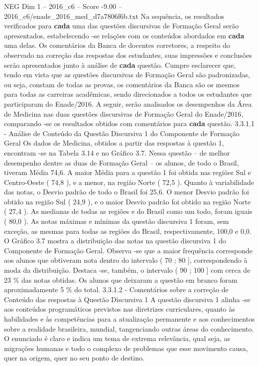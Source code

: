 \begin{textsample}{NEG Dim 1 – 2016\_c6 – Score -9.00 – 2016\_c6/enade\_2016\_med\_d7a7806f6b.txt}
Na sequência, os resultados verificados para \textbf{cada} uma das questões discursivas de Formação Geral serão apresentados, estabelecendo -se relações com os conteúdos abordados em \textbf{cada} uma delas.
Os comentários da Banca de docentes corretores, a respeito do observado na correção das respostas dos estudantes, suas impressões e conclusões serão apresentados junto à análise de \textbf{cada} questão.
Cumpre esclarecer que, tendo em vista que as questões discursivas de Formação Geral são padronizadas, ou seja, constam de todas as provas, os comentários da Banca são os mesmos para todas as carreiras acadêmicas, sendo direcionados a todos os estudantes que participaram do Enade/2016.
A seguir, serão analisados os desempenhos da Área de Medicina nas duas questões discursivas de Formação Geral do Enade/2016, comparando -se os resultados obtidos com comentários para \textbf{cada} questão. 3.3.1.1 - Análise de Conteúdo da Questão Discursiva 1 do Componente de Formação Geral Os dados de Medicina, obtidos a partir das respostas à questão 1, encontram -se na Tabela 3.14 e no Gráfico 3.7.
Nessa questão – de melhor desempenho dentre as duas de Formação Geral – os alunos, de todo o Brasil, tiveram Média 74,6.
A maior Média para a questão 1 foi obtida nas regiões Sul e Centro-Oeste ( 74,8 ), e a menor, na região Norte ( 72,5 ).
Quanto à variabilidade das notas, o Desvio padrão de todo o Brasil foi 25,6.
O menor Desvio padrão foi obtido na região Sul ( 24,9 ), e o maior Desvio padrão foi obtido na região Norte ( 27,4 ).
As medianas de todas as regiões e do Brasil como um todo, foram iguais ( 80,0 ).
As notas máximas e mínimas da questão discursiva 1 foram, sem exceção, as mesmas para todas as regiões do Brasil, respectivamente, 100,0 e 0,0.
O Gráfico 3.7 mostra a distribuição das notas na questão discursiva 1 do Componente de Formação Geral.
Observa -se que a maior frequência corresponde aos alunos que obtiveram nota dentro do intervalo ( 70 ; 80 ], correspondendo à moda da distribuição.
Destaca -se, também, o intervalo ( 90 ; 100 ] com cerca de 23 \% das notas obtidas.
Os alunos que deixaram a questão em branco foram aproximadamente 5 \% do total. 3.3.1.2 - Comentários sobre a correção de Conteúdo das respostas à Questão Discursiva 1 A questão discursiva 1 alinha -se aos conteúdos programáticos previstos nas diretrizes curriculares, quanto às habilidades e às competências para a atualização permanente e aos conhecimentos sobre a realidade brasileira, mundial, tangenciando outras áreas do conhecimento.
O enunciado é claro e indica um tema de extrema relevância, qual seja, as migrações humanas e todo o complexo de problemas que esse movimento causa, quer na origem, quer no seu ponto de destino.

\end{textsample}
